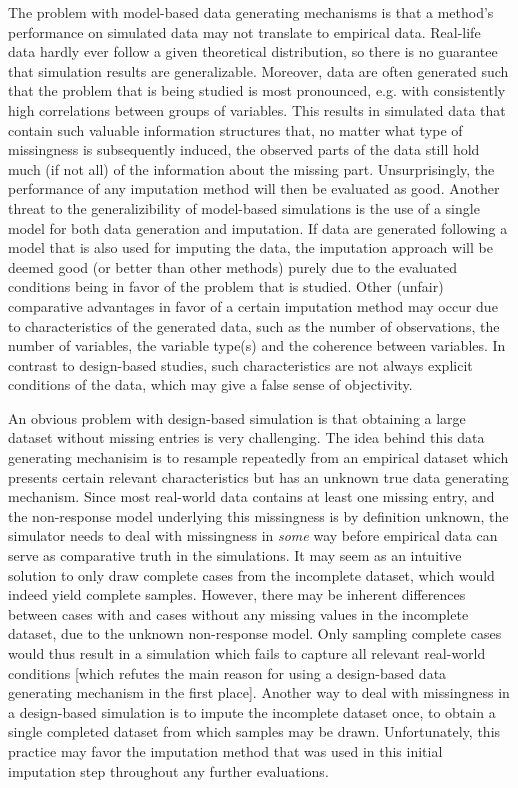 \documentclass[bimj,fleqn]{w-art}
\theoremstyle{plain}
\theoremstyle{definition}
\begin{document}
The problem with model-based data generating mechanisms is that a method's performance on simulated data may not translate to empirical data. Real-life data hardly ever follow a given theoretical distribution, so there is no guarantee that simulation results are generalizable. Moreover, data are often generated such that the problem that is being studied is most pronounced, e.g. with consistently high correlations between groups of variables. This results in simulated data that contain such valuable information structures that, no matter what type of missingness is subsequently induced, the observed parts of the data still hold much (if not all) of the information about the missing part. Unsurprisingly, the performance of any imputation method will then be evaluated as good. Another threat to the generalizibility of model-based simulations is the use of a single model for both data generation and imputation. If data are generated following a model that is also used for imputing the data, the imputation approach will be deemed good (or better than other methods) purely due to the evaluated conditions being in favor of the problem that is studied. Other (unfair) comparative advantages in favor of a certain imputation method may occur due to characteristics of the generated data, such as the number of observations, the number of variables, the variable type(s) and the coherence between variables. In contrast to design-based studies, such characteristics are not always explicit conditions of the data, which may give a false sense of objectivity. 

An obvious problem with design-based simulation is that obtaining a large dataset without missing entries is very challenging. The idea behind this data generating mechanisim is to resample repeatedly from an empirical dataset which presents certain relevant characteristics but has an unknown true data generating mechanism. Since most real-world data contains at least one missing entry, and the non-response model underlying this missingness is by definition unknown, the simulator needs to deal with missingness in \textit{some} way before empirical data can serve as comparative truth in the simulations. It may seem as an intuitive solution to only draw complete cases from the incomplete dataset, which would indeed yield complete samples. However, there may be inherent differences between cases with and cases without any missing values in the incomplete dataset, due to the unknown non-response model. Only sampling complete cases would thus result in a simulation which fails to capture all relevant real-world conditions [which refutes the main reason for using a design-based data generating mechanism in the first place]. Another way to deal with missingness in a design-based simulation is to impute the incomplete dataset once, to obtain a single completed dataset from which samples may be drawn. Unfortunately, this practice may favor the imputation method that was used in this initial imputation step throughout any further evaluations. 
\end{document}
